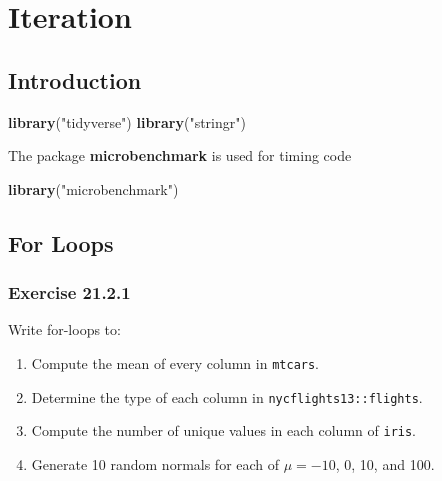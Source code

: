 \documentclass[]{book}
\newenvironment{Shaded}{\begin{snugshade}}{\end{snugshade}}
\newcommand{\KeywordTok}[1]{\textcolor[rgb]{0.13,0.29,0.53}{\textbf{#1}}}
\newcommand{\NormalTok}[1]{#1}
\newcommand{\StringTok}[1]{\textcolor[rgb]{0.31,0.60,0.02}{#1}}
\providecommand{\tightlist}{%
  \setlength{\itemsep}{0pt}\setlength{\parskip}{0pt}}
\theoremstyle{plain}
\theoremstyle{remark}
\begin{document}
\hypertarget{iteration}{%
\chapter{Iteration}\label{iteration}}

\hypertarget{introduction-14}{%
\section{Introduction}\label{introduction-14}}

\begin{Shaded}
\begin{Highlighting}[]
\KeywordTok{library}\NormalTok{(}\StringTok{"tidyverse"}\NormalTok{)}
\KeywordTok{library}\NormalTok{(}\StringTok{"stringr"}\NormalTok{)}
\end{Highlighting}
\end{Shaded}

The package \textbf{microbenchmark} is used for timing code

\begin{Shaded}
\begin{Highlighting}[]
\KeywordTok{library}\NormalTok{(}\StringTok{"microbenchmark"}\NormalTok{)}
\end{Highlighting}
\end{Shaded}

\hypertarget{for-loops}{%
\section{For Loops}\label{for-loops}}

\hypertarget{exercise-21.2.1}{%
\subsection*{\texorpdfstring{Exercise
{21.2.1}}{Exercise 21.2.1}}\label{exercise-21.2.1}}

Write for-loops to:

\begin{enumerate}
\def\labelenumi{\arabic{enumi}.}
\tightlist
\item
  Compute the mean of every column in \texttt{mtcars}.
\item
  Determine the type of each column in \texttt{nycflights13::flights}.
\item
  Compute the number of unique values in each column of \texttt{iris}.
\item
  Generate 10 random normals for each of \(\mu = -10\), 0, 10, and 100.
\end{enumerate}
\end{document}
